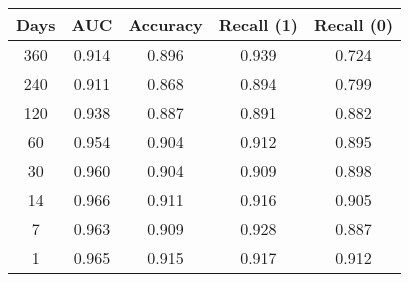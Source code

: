 \begin{tabular}{||c c c c c||}
\hline
Days & AUC & Accuracy & Recall (1) & Recall (0) \\
\hline\hline
360 & 0.914 & 0.896 & 0.939 & 0.724 \\
240 & 0.911 & 0.868 & 0.894 & 0.799 \\
120 & 0.938 & 0.887 & 0.891 & 0.882 \\
60 & 0.954 & 0.904 & 0.912 & 0.895 \\
30 & 0.960 & 0.904 & 0.909 & 0.898 \\
14 & 0.966 & 0.911 & 0.916 & 0.905 \\
7 & 0.963 & 0.909 & 0.928 & 0.887 \\
1 & 0.965 & 0.915 & 0.917 & 0.912 \\
\hline
\end{tabular}
